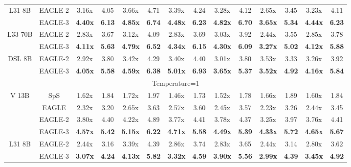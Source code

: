 \documentclass[11pt]{article}
\begin{document}
\begin{table}[h]
{\begin{tabular}{cccccccccccccc}
    \midrule
    \multirow{2}[2]{*}{L31 8B} & EAGLE-2 & 3.16x & 4.05  & 3.66x & 4.71  & 3.39x & 4.24  & 3.28x & 4.12  & 2.65x & 3.45  & 3.23x & 4.11 \\
          & EAGLE-3 & \textbf{4.40x} & \textbf{6.13} & \textbf{4.85x} & \textbf{6.74} & \textbf{4.48x} & \textbf{6.23} & \textbf{4.82x} & \textbf{6.70} & \textbf{3.65x} & \textbf{5.34} & \textbf{4.44x} & \textbf{6.23} \\
    \midrule
    \multirow{2}[1]{*}{L33 70B} & EAGLE-2 & 2.83x & 3.67  & 3.12x & 4.09  & 2.83x & 3.69  & 3.03x & 3.92  & 2.44x & 3.55  & 2.85x & 3.78 \\
          & EAGLE-3 & \textbf{4.11x} & \textbf{5.63} & \textbf{4.79x} & \textbf{6.52} & \textbf{4.34x} & \textbf{6.15} & \textbf{4.30x} & \textbf{6.09} & \textbf{3.27x} & \textbf{5.02} & \textbf{4.12x} & \textbf{5.88} \\
    \midrule
    \multirow{2}[1]{*}{DSL 8B} & EAGLE-2 & 2.92x & 3.80  & 3.42x & 4.29  & 3.40x & 4.40  & 3.01x & 3.80  & 3.53x & 3.33  & 3.26x & 3.92 \\
          & EAGLE-3 & \textbf{4.05x} & \textbf{5.58} & \textbf{4.59x} & \textbf{6.38} & \textbf{5.01x} & \textbf{6.93} & \textbf{3.65x} & \textbf{5.37} & \textbf{3.52x} & \textbf{4.92} & \textbf{4.16x} & \textbf{5.84} \\
    \midrule
    \multicolumn{14}{c}{Temperature=1} \\
    \midrule
    \multirow{4}[2]{*}{V 13B} & SpS   & 1.62x & 1.84  & 1.72x & 1.97  & 1.46x & 1.73  & 1.52x & 1.78  & 1.66x & 1.89  & 1.60x & 1.84 \\
          & EAGLE & 2.32x & 3.20  & 2.65x & 3.63  & 2.57x & 3.60  & 2.45x & 3.57  & 2.23x & 3.26  & 2.44x & 3.45 \\
          & EAGLE-2 & 3.80x & 4.40  & 4.22x & 4.89  & 3.77x & 4.41  & 3.78x & 4.37  & 3.25x & 3.97  & 3.76x & 4.41 \\
          & EAGLE-3 & \textbf{4.57x} & \textbf{5.42} & \textbf{5.15x} & \textbf{6.22} & \textbf{4.71x} & \textbf{5.58} & \textbf{4.49x} & \textbf{5.39} & \textbf{4.33x} & \textbf{5.72} & \textbf{4.65x} & \textbf{5.67} \\
    \midrule
    \multirow{2}[2]{*}{L31 8B} & EAGLE-2 & 2.44x & 3.16  & 3.39x & 4.39  & 2.86x & 3.74  & 2.83x & 3.65  & 2.44x & 3.14  & 2.80x & 3.62 \\
          & EAGLE-3 & \textbf{3.07x} & \textbf{4.24} & \textbf{4.13x} & \textbf{5.82} & \textbf{3.32x} & \textbf{4.59} & \textbf{3.90x} & \textbf{5.56} & \textbf{2.99x} & \textbf{4.39} & \textbf{3.45x} & \textbf{4.92} \\

\end{tabular}}
\end{table}
\end{document}
